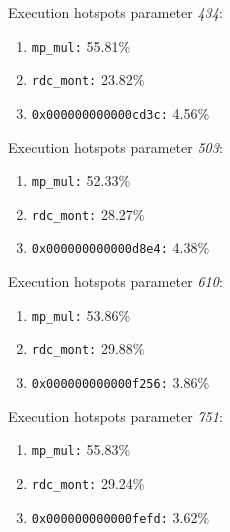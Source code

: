 Execution hotspots parameter \textit{434}:
\begin{enumerate}[noitemsep]
	\item \texttt{mp\_mul:} 55.81\%
	\item \texttt{rdc\_mont:} 23.82\%
	\item \texttt{0x000000000000cd3c:} 4.56\%
\end{enumerate}
Execution hotspots parameter \textit{503}:
\begin{enumerate}[noitemsep]
	\item \texttt{mp\_mul:} 52.33\%
	\item \texttt{rdc\_mont:} 28.27\%
	\item \texttt{0x000000000000d8e4:} 4.38\%
\end{enumerate}
Execution hotspots parameter \textit{610}:
\begin{enumerate}[noitemsep]
	\item \texttt{mp\_mul:} 53.86\%
	\item \texttt{rdc\_mont:} 29.88\%
	\item \texttt{0x000000000000f256:} 3.86\%
\end{enumerate}
Execution hotspots parameter \textit{751}:
\begin{enumerate}[noitemsep]
	\item \texttt{mp\_mul:} 55.83\%
	\item \texttt{rdc\_mont:} 29.24\%
	\item \texttt{0x000000000000fefd:} 3.62\%
\end{enumerate}
